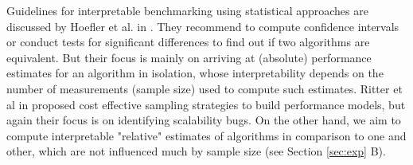 \documentclass[conference]{IEEEtran}
\newcommand{\p}[1]{{\color{blue} Pdj: #1}}
\begin{document}
%
%
Guidelines for interpretable benchmarking using statistical approaches are discussed by Hoefler et al. in \cite{hoefler2015scientific}. They recommend to compute confidence intervals or conduct tests for significant differences to find out if two
algorithms are equivalent. But their focus is mainly on arriving at (absolute) performance estimates for an algorithm in isolation, whose interpretability depends on the number of measurements (sample size) used to compute such estimates. Ritter et al in \cite{ritter2020learning} proposed cost effective sampling strategies to build performance models, but again their focus is on identifying scalability bugs. On the other hand, we aim to compute interpretable "relative" estimates of algorithms in comparison to one and other, which are not influenced much by sample size (see Section \ref{sec:exp} B).
 
%
 
\end{document}
